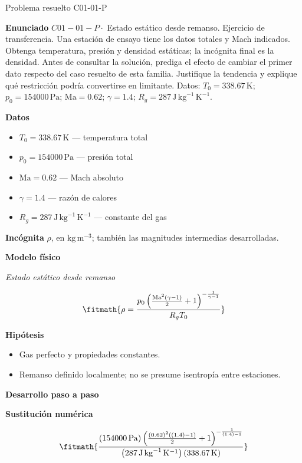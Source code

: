 \documentclass[10pt,openany]{book}
\begin{document}
\begin{studiumworked}{Problema resuelto C01-01-P}


\noindent\textbf{Enunciado}
\(C01-01-P \cdot\) Estado estático desde remanso. Ejercicio de transferencia. Una estación de ensayo tiene los datos totales y Mach indicados. Obtenga temperatura, presión y densidad estáticas; la incógnita final es la densidad. Antes de consultar la solución, prediga el efecto de cambiar el primer dato respecto del caso resuelto de esta familia. Justifique la tendencia y explique qué restricción podría convertirse en limitante. Datos: \(T_0=338.67\, \mathrm{K}\); \(p_0=154000\, \mathrm{Pa}\); \(\mathrm{Ma}=0.62\); \(\gamma=1.4\); \(R_g=287\, \mathrm{J}\,\mathrm{kg}^{-1}\,\mathrm{K}^{-1}\).

\noindent\textbf{Datos}
\begin{itemize}
\item $T_0 = 338.67\,\mathrm{K}$ — temperatura total
\item $p_0 = 154000\,\mathrm{Pa}$ — presión total
\item $\mathrm{Ma} = 0.62$ — Mach absoluto
\item $\gamma = 1.4$ — razón de calores
\item $R_g = 287\,\mathrm{J}\,\mathrm{kg}^{-1}\,\mathrm{K}^{-1}$ — constante del gas
\end{itemize}

\noindent\textbf{Incógnita}
$\rho$, en $\mathrm{kg\,m^{-3}}$; también las magnitudes intermedias desarrolladas.

\noindent\textbf{Modelo físico}

\noindent\textit{Estado estático desde remanso}

\[
\fitmath{\rho=\frac{p_0 \left(\frac{\mathrm{Ma}^{2} \left(\gamma - 1\right)}{2} + 1\right)^{- \frac{1}{\gamma - 1}}}{R_g T_0}}
\]

\noindent\textbf{Hipótesis}
\begin{itemize}
\item Gas perfecto y propiedades constantes.
\item Remanso definido localmente; no se presume isentropía entre estaciones.
\end{itemize}

\noindent\textbf{Desarrollo paso a paso}



\noindent\textbf{Sustitución numérica}

\[
\fitmath{\frac{\left(154000\,\mathrm{Pa}\right) \left(\frac{\left(0.62\right)^{2} \left(\left(1.4\right) - 1\right)}{2} + 1\right)^{- \frac{1}{\left(1.4\right) - 1}}}{\left(287\,\mathrm{J}\,\mathrm{kg}^{-1}\,\mathrm{K}^{-1}\right) \left(338.67\,\mathrm{K}\right)}}
\]


\end{studiumworked}
\end{document}
